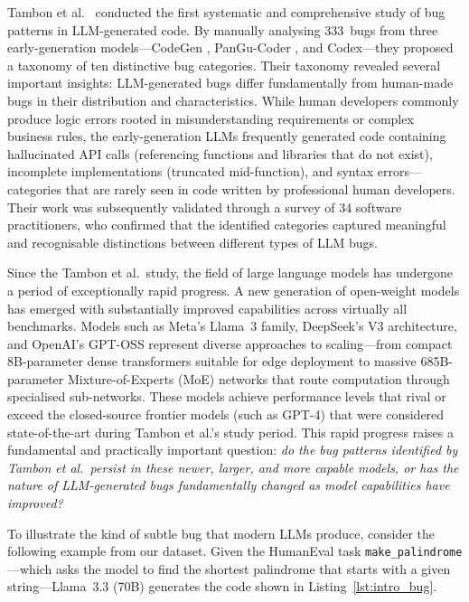 \documentclass[smallextended]{svjour3}
\begin{document}
Tambon et al.\ \citep{tambon2025bugs} conducted the first systematic and comprehensive study of bug patterns in LLM-generated code. By manually analysing 333~bugs from three early-generation models---CodeGen \citep{nijkamp2023codegen}, PanGu-Coder \citep{christopoulou2022pangu}, and Codex---they proposed a taxonomy of ten distinctive bug categories. Their taxonomy revealed several important insights: LLM-generated bugs differ fundamentally from human-made bugs in their distribution and characteristics. While human developers commonly produce logic errors rooted in misunderstanding requirements or complex business rules, the early-generation LLMs frequently generated code containing hallucinated API calls (referencing functions and libraries that do not exist), incomplete implementations (truncated mid-function), and syntax errors---categories that are rarely seen in code written by professional human developers. Their work was subsequently validated through a survey of 34 software practitioners, who confirmed that the identified categories captured meaningful and recognisable distinctions between different types of LLM bugs.

Since the Tambon et al.\ study, the field of large language models has undergone a period of exceptionally rapid progress. A new generation of open-weight models has emerged with substantially improved capabilities across virtually all benchmarks. Models such as Meta's Llama~3 family, DeepSeek's V3 architecture, and OpenAI's GPT-OSS represent diverse approaches to scaling---from compact 8B-parameter dense transformers suitable for edge deployment to massive 685B-parameter Mixture-of-Experts (MoE) networks that route computation through specialised sub-networks. These models achieve performance levels that rival or exceed the closed-source frontier models (such as GPT-4) that were considered state-of-the-art during Tambon et al.'s study period. This rapid progress raises a fundamental and practically important question: \emph{do the bug patterns identified by Tambon et al.\ persist in these newer, larger, and more capable models, or has the nature of LLM-generated bugs fundamentally changed as model capabilities have improved?}

To illustrate the kind of subtle bug that modern LLMs produce, consider the following example from our dataset. Given the HumanEval task \texttt{make\_palindrome}---which asks the model to find the shortest palindrome that starts with a given string---Llama~3.3 (70B) generates the code shown in Listing~\ref{lst:intro_bug}.
\end{document}
